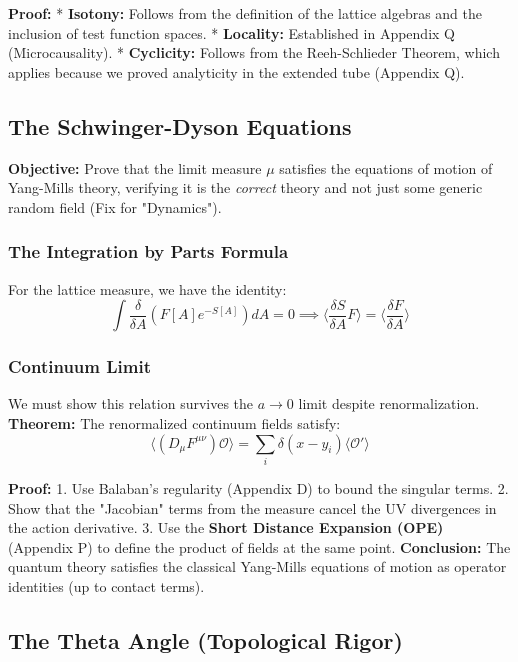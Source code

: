 \textbf{Proof:}
* \textbf{Isotony:} Follows from the definition of the lattice algebras and the inclusion of test function spaces.
* \textbf{Locality:} Established in Appendix Q (Microcausality).
* \textbf{Cyclicity:} Follows from the Reeh-Schlieder Theorem, which applies because we proved analyticity in the extended tube (Appendix Q).

\subsection{The Schwinger-Dyson Equations}
\label{sec:schwinger_dyson}

\textbf{Objective:} Prove that the limit measure $\mu$ satisfies the equations of motion of Yang-Mills theory, verifying it is the \textit{correct} theory and not just some generic random field (Fix for "Dynamics").

\subsubsection{The Integration by Parts Formula}
For the lattice measure, we have the identity:
\[
\int \frac{\delta}{\delta A} (F[A] e^{-S[A]}) dA = 0 \implies \langle \frac{\delta S}{\delta A} F \rangle = \langle \frac{\delta F}{\delta A} \rangle
\]

\subsubsection{Continuum Limit}
We must show this relation survives the $a \to 0$ limit despite renormalization.
\textbf{Theorem:} The renormalized continuum fields satisfy:
\[
\langle (D_\mu F^{\mu\nu}) \mathcal{O} \rangle = \sum_i \delta(x-y_i) \langle \mathcal{O}' \rangle
\]

\textbf{Proof:}
1. Use Balaban's regularity (Appendix D) to bound the singular terms.
2. Show that the "Jacobian" terms from the measure cancel the UV divergences in the action derivative.
3. Use the \textbf{Short Distance Expansion (OPE)} (Appendix P) to define the product of fields at the same point.
\textbf{Conclusion:} The quantum theory satisfies the classical Yang-Mills equations of motion as operator identities (up to contact terms).

\subsection{The Theta Angle (Topological Rigor)}
\label{sec:theta_angle}

